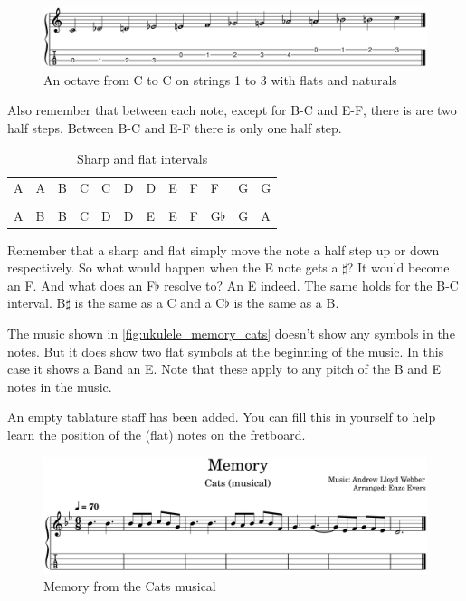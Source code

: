 \begin{figure}[h]
	\centering
	\includegraphics[width=\textwidth]{../../MuseScore/Ukulele/UkuleleChromaticNotesFlatsMultiString.png}
	\caption{An octave from C to C on strings 1 to 3 with flats and naturals}
	\label{fig:ukulele_multi_string_octave_flats_chapter_music_notation}
\end{figure}

Also remember that between each note, except for B-C and E-F, there is are two half steps. Between B-C and E-F there is only one half step.

\begin{table}[h]
	\centering
	\begin{tabular}{*{12}{P{5mm}}}
		\large{A} & \large{A\sharp} & \large{B} & \large{C} & \large{C\sharp} & \large{D} & \large{D\sharp} & \large{E} & \large{F} & \large{F\sharp} & \large{G} & \large{G\sharp} \\ \\
		\large{A} & \large{B\flat} & \large{B} & \large{C} & \large{D\flat} & \large{D} & \large{E\flat} & \large{E} & \large{F} & \large{G$\flat$}& \large{G} & \large{A\flat}
	\end{tabular}
	\caption{Sharp and flat intervals}
	\label{tab:ukulele_sharp_flat_intervals}
\end{table}

Remember that a sharp and flat simply move the note a half step up or down respectively. So what would happen when the E note gets a $\sharp$? It would become an F. And what does an F$\flat$ resolve to? An E indeed. The same holds for the B-C interval. B$\sharp$ is the same as a C and a C$\flat$ is the same as a B.

\newpage

The music shown in \autoref{fig:ukulele_memory_cats} doesn't show any symbols in the notes. But it does show two flat symbols at the beginning of the music. In this case it shows a B\flat and an E\flat. Note that these apply to any pitch of the B and E notes in the music.

An empty tablature staff has been added. You can fill this in yourself to help learn the position of the (flat) notes on the fretboard.

\begin{figure}[h]
	\centering
	\includegraphics[width=\textwidth]{../../MuseScore/Ukulele/UkuleleMemoryCats.png}
	\caption{Memory from the Cats musical}
	\label{fig:ukulele_memory_cats}
\end{figure}

